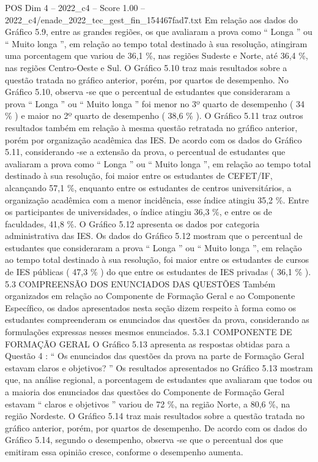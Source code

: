 \begin{textsample}{POS Dim 4 – 2022\_c4 – Score 1.00 – 2022\_c4/enade\_2022\_tec\_gest\_fin\_154467fad7.txt}
Em relação aos dados do Gráfico 5.9, entre as grandes regiões, os que avaliaram a prova como “ Longa ” ou “ Muito longa ”, em relação ao tempo total destinado à sua resolução, atingiram uma porcentagem que variou de 36,1 \%, nas regiões Sudeste e Norte, até 36,4 \%, nas regiões Centro-Oeste e Sul.
O Gráfico 5.10 traz mais resultados sobre a questão tratada no gráfico anterior, porém, por quartos de desempenho.
No Gráfico 5.10, observa -se que o percentual de estudantes que consideraram a prova “ Longa ” ou “ Muito longa ” foi menor no 3º quarto de desempenho ( 34 \% ) e maior no 2º quarto de desempenho ( 38,6 \% ).
O Gráfico 5.11 traz outros resultados também em relação à mesma questão retratada no gráfico anterior, porém por organização acadêmica das IES.
De acordo com os dados do Gráfico 5.11, considerando -se a extensão da prova, o percentual de estudantes que avaliaram a prova como “ Longa ” ou “ Muito longa ”, em relação ao tempo total destinado à sua resolução, foi maior entre os estudantes de CEFET/IF, alcançando 57,1 \%, enquanto entre os estudantes de centros universitários, a organização acadêmica com a menor incidência, esse índice atingiu 35,2 \%.
Entre os participantes de universidades, o índice atingiu 36,3 \%, e entre os de faculdades, 41,8 \%.
O Gráfico 5.12 apresenta os dados por categoria administrativa das IES.
Os dados do Gráfico 5.12 mostram que o percentual de estudantes que consideraram a prova “ Longa ” ou “ Muito longa ”, em relação ao tempo total destinado à sua resolução, foi maior entre os estudantes de cursos de IES públicas ( 47,3 \% ) do que entre os estudantes de IES privadas ( 36,1 \% ). 5.3 COMPREENSÃO DOS ENUNCIADOS DAS QUESTÕES Também organizados em relação ao Componente de Formação Geral e ao Componente Específico, os dados apresentados nesta seção dizem respeito à forma como os estudantes compreenderam os enunciados das questões da prova, considerando as formulações expressas nesses mesmos enunciados. 5.3.1 COMPONENTE DE FORMAÇÃO GERAL O Gráfico 5.13 apresenta as respostas obtidas para a Questão 4 : “ Os enunciados das questões da prova na parte de Formação Geral estavam claros e objetivos? ” Os resultados apresentados no Gráfico 5.13 mostram que, na análise regional, a porcentagem de estudantes que avaliaram que todos ou a maioria dos enunciados das questões do Componente de Formação Geral estavam “ claros e objetivos ” variou de 72 \%, na região Norte, a 80,6 \%, na região Nordeste.
O Gráfico 5.14 traz mais resultados sobre a questão tratada no gráfico anterior, porém, por quartos de desempenho.
De acordo com os dados do Gráfico 5.14, segundo o desempenho, observa -se que o percentual dos que emitiram essa opinião cresce, conforme o desempenho aumenta.

\end{textsample}
